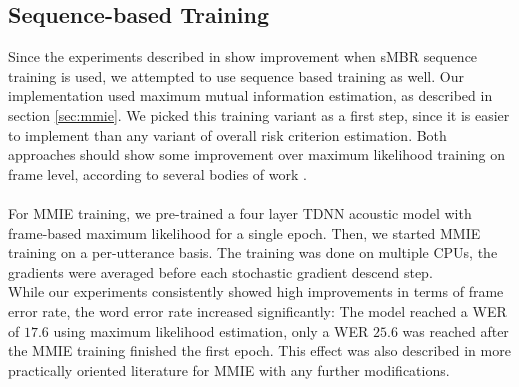 \subsection{Sequence-based Training}
Since the experiments described in \cite{peddinti2015jhu} show improvement when sMBR sequence training is used, we attempted to use sequence based training as well. Our implementation used maximum mutual information estimation, as described in section \ref{sec:mmie}. We picked this training variant as a first step, since it is easier to implement than any variant of overall risk criterion estimation. Both approaches should show some improvement over maximum likelihood training on frame level, according to several bodies of work \cite{povey2005discriminative} \cite{ghoshal2013sequence}. \\ \\
For MMIE training, we pre-trained a four layer TDNN acoustic model with frame-based maximum likelihood for a single epoch. Then, we started MMIE training on a per-utterance basis. The training was done on multiple CPUs, the gradients were averaged before each stochastic gradient descend step. \\ 
While our experiments consistently showed high improvements in terms of frame error rate, the word error rate increased significantly: The model reached a WER of $17.6$ using maximum likelihood estimation, only a WER $25.6$ was reached after the MMIE training finished the first epoch. This effect was also described in more practically oriented literature \cite{su2013error} for MMIE with any further modifications. \\


